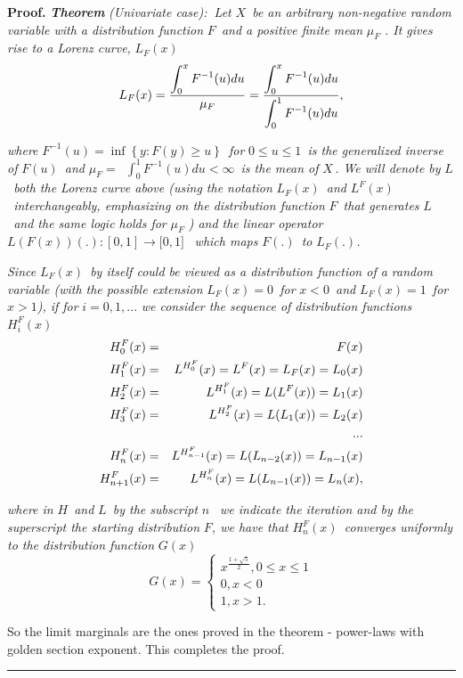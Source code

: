\documentclass[onecolumn]{article}
\providecommand{\dint}{\displaystyle\int}
\newenvironment{proof}[1][Proof]{\noindent\textbf{#1.} }{\ \rule{0.5em}{0.5em}}
\renewcommand{\dint}{\displaystyle\int}
\begin{document}
\begin{proof}
\textbf{\textit{Theorem }}\textit{(Univariate case):}\textbf{\ }\textit{Let }%
$X$\textit{\ be an arbitrary non-negative random variable with a
distribution function }$F$\textit{\ and a positive finite mean }$\mu _{F}$%
\textit{. It gives rise to a Lorenz curve, }$L_{F}(x)$%
\begin{equation}
L_{F}(x)=\frac{\dint\nolimits_{0}^{x}F^{-1}(u)du}{\mu _{F}}=\frac{%
\dint\nolimits_{0}^{x}F^{-1}(u)du}{\dint\nolimits_{0}^{1}F^{-1}(u)du},
\label{104}
\end{equation}

\textit{where }$F^{-1}(u)=\inf \left\{ y:F(y)\geq u\right\} $\textit{\ for }$%
0\leq u\leq 1$\textit{\ is the generalized inverse of }$F(u)$\textit{\ and }$%
\mu _{F}=$\textit{\ }$\dint\nolimits_{0}^{1}F^{-1}(u)du<\infty $\textit{\ is
the mean of }$X\,$\textit{. We will denote by }$L$\textit{\ both the Lorenz
curve above (using the notation }$L_{F}(x)$\textit{\ and }$L^{F}(x)$\textit{%
\ interchangeably, emphasizing on the distribution function }$F$\textit{\
that generates }$L$\textit{\ and the same logic holds for }$\mu _{F}$\textit{%
) and the linear operator }$L(F(x))(.):[0,1]\rightarrow \lbrack 0,1]$\textit{%
\ which maps }$F(.)$\textit{\ to }$L_{F}(.)$\textit{.}

\textit{Since }$L_{F}(x)$\textit{\ by itself could be viewed as a
distribution function of a random variable (with the possible extension }$%
L_{F}(x)=0$\textit{\ for }$x<0$\textit{\ and }$L_{F}(x)=1$\textit{\ for }$%
x>1 $\textit{), if for }$i=0,1,...$ \textit{we consider the sequence of
distribution functions }$H_{i}^{F}(x)$%
\begin{eqnarray}
H_{0}^{F}(x) &=&F(x)  \label{104.1} \\
H_{1}^{F}(x) &=&L^{H_{0}^{F}}(x)=L^{F}(x)=L_{F}(x)=L_{0}(x)  \notag \\
H_{2}^{F}(x) &=&L^{H_{1}^{F}}(x)=L(L^{F}(x))=L_{1}(x)  \notag \\
H_{3}^{F}(x) &=&L^{H_{2}^{F}}(x)=L(L_{1}(x))=L_{2}(x)  \notag \\
&&...  \notag \\
H_{n}^{F}(x) &=&L^{H_{n-1}^{F}}(x)=L(L_{n-2}(x))=L_{n-1}(x)  \notag \\
H_{n+1}^{F}(x) &=&L^{H_{n}^{F}}(x)=L(L_{n-1}(x))=L_{n}(x),  \notag
\end{eqnarray}

\textit{where in }$H$\textit{\ and }$L$\textit{\ by the subscript }$n$%
\textit{\ we indicate the iteration and by the superscript the starting
distribution }$F$\textit{, we have that }$H_{n}^{F}(x)$\textit{\ converges
uniformly to the distribution function }$G(x)$\textit{\ }%
\begin{equation}
G(x)=\left\{ 
\begin{array}{c}
x^{\frac{1+\sqrt{5}}{2}},0\leq x\leq 1 \\ 
0,x<0 \\ 
1,x>1.%
\end{array}%
\right.  \label{104.2}
\end{equation}

So the limit marginals are the ones proved in the theorem - power-laws with
golden section exponent. This completes the proof.
\end{proof}
\end{document}
